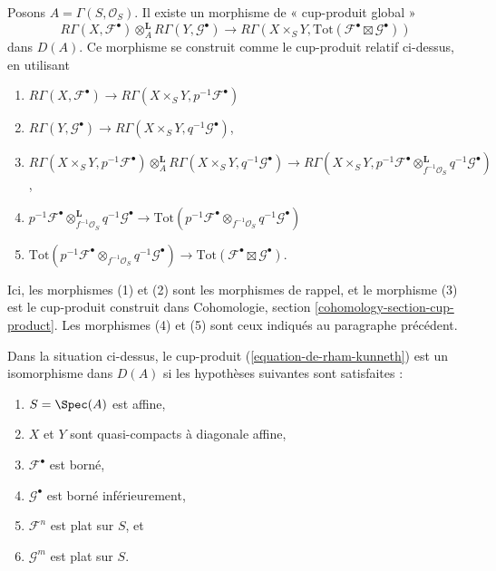 \medskip\noindent
Posons $A = \Gamma(S, \mathcal{O}_S)$. Il existe un morphisme de « cup-produit global »
\begin{equation}
\label{equation-de-rham-kunneth}
R\Gamma(X, \mathcal{F}^\bullet)
\otimes_A^\mathbf{L}
R\Gamma(Y, \mathcal{G}^\bullet)
\longrightarrow
R\Gamma(X \times_S Y,
\text{Tot}(\mathcal{F}^\bullet \boxtimes \mathcal{G}^\bullet))
\end{equation}
dans $D(A)$. Ce morphisme se construit comme le cup-produit relatif ci-dessus,
en utilisant
\begin{enumerate}
\item $R\Gamma(X, \mathcal{F}^\bullet) \to
R\Gamma(X \times_S Y, p^{-1}\mathcal{F}^\bullet)$
\item $R\Gamma(Y, \mathcal{G}^\bullet) \to
R\Gamma(X \times_S Y, q^{-1}\mathcal{G}^\bullet)$,
\item $R\Gamma(X \times_S Y, p^{-1}\mathcal{F}^\bullet)
\otimes_A^\mathbf{L} R\Gamma(X \times_S Y, q^{-1}\mathcal{G}^\bullet) \to
R\Gamma(X \times_S Y,
p^{-1}\mathcal{F}^\bullet \otimes_{f^{-1}\mathcal{O}_S}^\mathbf{L}
q^{-1}\mathcal{G}^\bullet)$,
\item
$p^{-1}\mathcal{F}^\bullet \otimes_{f^{-1}\mathcal{O}_S}^\mathbf{L}
q^{-1}\mathcal{G}^\bullet \to
\text{Tot}(p^{-1}\mathcal{F}^\bullet \otimes_{f^{-1}\mathcal{O}_S}
q^{-1}\mathcal{G}^\bullet)$
\item
$\text{Tot}(p^{-1}\mathcal{F}^\bullet \otimes_{f^{-1}\mathcal{O}_S}
q^{-1}\mathcal{G}^\bullet) \to \text{Tot}(\mathcal{F}^\bullet \boxtimes
\mathcal{G}^\bullet)$.
\end{enumerate}
Ici, les morphismes (1) et (2) sont les morphismes de rappel, et le morphisme (3)
est le cup-produit construit dans Cohomologie, section \ref{cohomology-section-cup-product}.
Les morphismes (4) et (5) sont ceux indiqués au paragraphe précédent.

\begin{lemma}
\label{lemma-kunneth-special}
Dans la situation ci-dessus, le cup-produit (\ref{equation-de-rham-kunneth})
est un isomorphisme dans $D(A)$ si les hypothèses suivantes sont satisfaites :
\begin{enumerate}
\item $S = \Spec(A)$ est affine,
\item $X$ et $Y$ sont quasi-compacts à diagonale affine,
\item $\mathcal{F}^\bullet$ est borné,
\item $\mathcal{G}^\bullet$ est borné inférieurement,
\item $\mathcal{F}^n$ est plat sur $S$, et
\item $\mathcal{G}^m$ est plat sur $S$.
\end{enumerate}
\end{lemma}

